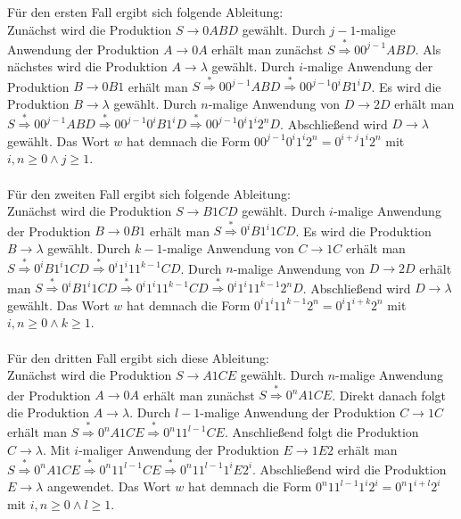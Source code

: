 \documentclass[10pt,a4paper,oneside,ngerman,numbers=noenddot]{scrartcl}
\begin{document}
Für den ersten Fall ergibt sich folgende Ableitung:\\
Zunächst wird die Produktion $S \rightarrow 0ABD$ gewählt. Durch $j-1$-malige Anwendung der Produktion $A \rightarrow 0A$ erhält man zunächst $S \overset{*}{\Longrightarrow} 00^{j-1}ABD$. Als nächstes wird die Produktion $A \rightarrow \lambda$ gewählt. Durch $i$-malige Anwendung der Produktion $B \rightarrow 0B1$ erhält man $S \overset{*}{\Longrightarrow} 00^{j-1}ABD \overset{*}{\Longrightarrow} 00^{j-1}0^{i}B1^{i}D$. Es wird die Produktion $B \rightarrow \lambda$ gewählt. Durch $n$-malige Anwendung von $D \rightarrow 2D$ erhält man $S \overset{*}{\Longrightarrow} 00^{j-1}ABD \overset{*}{\Longrightarrow} 00^{j-1}0^{i}B1^{i}D \overset{*}{\Longrightarrow} 00^{j-1}0^{i}1^{i}2^{n}D$. Abschließend wird $D \rightarrow \lambda$ gewählt. Das Wort $w$ hat demnach die Form $00^{j-1}0^{i}1^{i}2^{n} = 0^{i + j}1^{i}2^{n}$ mit $i, n \geq 0 \wedge j \geq 1$.\\
\\
Für den zweiten Fall ergibt sich folgende Ableitung:\\
Zunächst wird die Produktion $S \rightarrow B1CD$ gewählt. Durch $i$-malige Anwendung der Produktion $B \rightarrow 0B1$ erhält man $S \overset{*}{\Longrightarrow}0^{i}B1^{i}1CD$. Es wird die Produktion $B \rightarrow \lambda$ gewählt. Durch $k-1$-malige Anwendung von $C \rightarrow 1C$ erhält man $S \overset{*}{\Longrightarrow}0^{i}B1^{i}1CD \overset{*}{\Longrightarrow} 0^{i}1^{i}11^{k-1}CD$. Durch $n$-malige Anwendung von $D \rightarrow 2D$ erhält man $S \overset{*}{\Longrightarrow}0^{i}B1^{i}1CD \overset{*}{\Longrightarrow} 0^{i}1^{i}11^{k-1}CD \overset{*}{\Longrightarrow} 0^{i}1^{i}11^{k-1}2^{n}D$. Abschließend wird $D \rightarrow \lambda$ gewählt. Das Wort $w$ hat demnach die Form $0^{i}1^{i}11^{k-1}2^{n} = 0^{i}1^{i + k}2^{n}$ mit $i, n \geq 0 \wedge k \geq 1$.\\
\\
Für den dritten Fall ergibt sich diese Ableitung:\\
Zunächst wird die Produktion $S \rightarrow A1CE$ gewählt. Durch $n$-malige Anwendung der Produktion $A \rightarrow 0A$ erhält man zunächst $S \overset{*}{\Longrightarrow} 0^{n}A1CE$. Direkt danach folgt die Produktion $A \rightarrow \lambda$. Durch $l-1$-malige Anwendung der Produktion $C \rightarrow 1C$ erhält man $S \overset{*}{\Longrightarrow} 0^{n}A1CE \overset{*}{\Longrightarrow} 0^{n}11^{l-1}CE$. Anschließend folgt die Produktion $C \rightarrow \lambda$. Mit $i$-maliger Anwendung der Produktion  $E \rightarrow 1E2$ erhält man $S \overset{*}{\Longrightarrow} 0^{n}A1CE \overset{*}{\Longrightarrow} 0^{n}11^{l-1}CE \overset{*}{\Longrightarrow} 0^{n}11^{l-1}1^{i}E2^{i}$. Abschließend wird die Produktion $E \rightarrow \lambda$ angewendet. Das Wort $w$ hat demnach die Form $0^{n}11^{l-1}1^{i}2^{i} = 0^{n}1^{i + l}2^{i}$ mit $i,n \geq 0 \wedge l \geq 1$. \\
\end{document}
